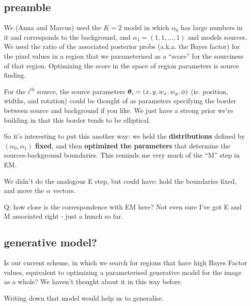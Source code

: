 \documentclass[12pt]{article}
\newcommand{\btheta}{\mbox{\boldmath $\theta$}}
\begin{document}
\subsection{preamble}

We (Anna and Marcus) used the $K=2$ model in which $\alpha_0$ has
large numbers in it and corresponds to the background, and $\alpha_1 =
(1,1,\ldots,1)$ and models sources. We used the ratio of the
associated posterior probs (a.k.a. the Bayes factor) for the pixel
values in a region that we parameterised as a ``score'' for the
sourciness of that region.  Optimizing the score in the space of
region parameters is source finding.

For the $i^{th}$ source, the source parameters $\btheta_i =
(x,y,w_x,w_y,\phi)$ (ie. position, widths, and rotation) could be
thought of as parameters specifying the border between source and
background if you like. We just have a strong prior we're building in
that this border tends to be elliptical.

So it's interesting to put this another way: we held the  {\bf distributions} defined by
$(\alpha_0,\alpha_1)$ {\bf fixed}, and then {\bf optimized the parameters} that
determine the sources-background boundaries.
This reminds me very much of the ``M'' step in EM. 

We didn't do the analogous E step, but could have: hold the
boundaries fixed, and move the $\alpha$ vectors.

Q: how close is the correspondence with EM here? Not even sure I've
got E and M associated right - just a hunch so far.

\subsection{generative model?}
Is our current scheme, in which we search for regions that have high
Bayes Factor values, equivalent to optimizing a parameterised
generative model for the image as a whole? We haven't thought about it
in this way before.

Writing down that model would help us to generalise.
\end{document}

